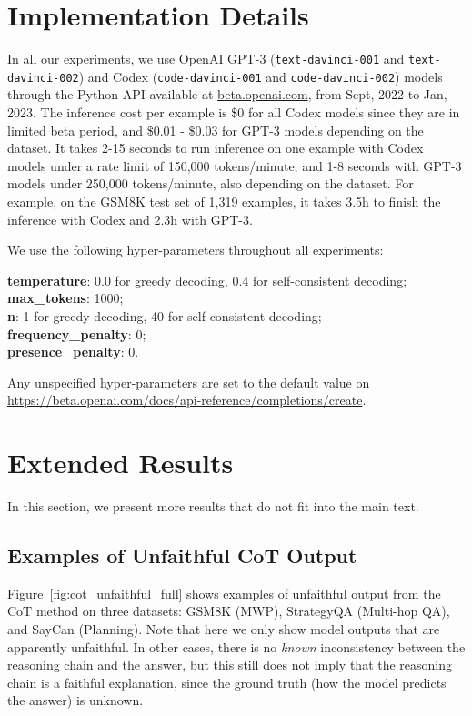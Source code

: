 \documentclass[11pt]{article}
\begin{document}
\newpage
\appendix

\section{Implementation Details}
\label{sec:appendix_implementation}

In all our experiments, we use OpenAI GPT-3 (\texttt{text-davinci-001} and \texttt{text-davinci-002}) and Codex  (\texttt{code-davinci-001} and \texttt{code-davinci-002}) models through the Python API available at \url{beta.openai.com}, from Sept, 2022 to Jan, 2023. The inference cost per example is \$0 for all Codex models since they are in limited beta period, and \$0.01 - \$0.03 for GPT-3 models depending on the dataset. It takes 2-15 seconds to run inference on one example with Codex models under a rate limit of 150,000 tokens/minute, and 1-8 seconds with GPT-3 models under 250,000 tokens/minute, also depending on the dataset. For example, on the GSM8K test set of 1,319 examples, it takes 3.5h to finish the inference with Codex and 2.3h with GPT-3.

We use the following hyper-parameters throughout all experiments:

\textbf{temperature}: 0.0 for greedy decoding, 0.4 for self-consistent decoding;\\
\textbf{max\_tokens}: 1000;\\
\textbf{n}: 1 for greedy decoding, 40 for self-consistent decoding;\\
\textbf{frequency\_penalty}: 0;\\
\textbf{presence\_penalty}: 0.

Any unspecified hyper-parameters are set to the default value on \url{https://beta.openai.com/docs/api-reference/completions/create}.

\section{Extended Results}
\label{sec:appendix_extended_results}

In this section, we present more results that do not fit into the main text.

\subsection{Examples of Unfaithful CoT Output}
\label{appendix:unfaithful_output}

Figure~\ref{fig:cot_unfaithful_full} shows examples of unfaithful output from the CoT method \cite{wei_chain_2022} on three datasets: GSM8K (MWP), StrategyQA (Multi-hop QA), and SayCan (Planning). Note that here we only show model outputs that are apparently unfaithful. In other cases, there is no \textit{known} inconsistency between the reasoning chain and the answer, but this still does not imply that the reasoning chain is a faithful explanation, since the ground truth (how the model predicts the answer) is unknown.
\end{document}
